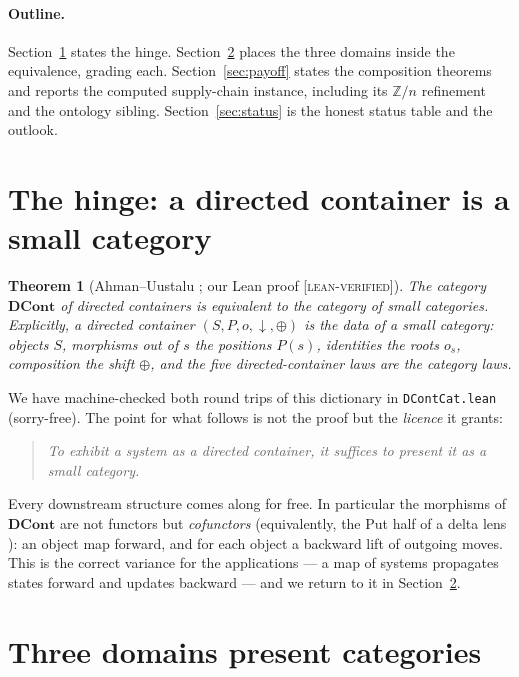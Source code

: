 \documentclass[11pt]{article}
\newtheorem{theorem}{Theorem}
\theoremstyle{definition}
\newcommand{\DCont}{\mathbf{DCont}}
\newcommand{\Zn}{\mathbb{Z}/n}
\newcommand{\gLean}{\textsc{[lean-verified]}}
\begin{document}
\paragraph{Outline.} Section~\ref{sec:hinge} states the hinge. Section~\ref{sec:domains}
places the three domains inside the equivalence, grading each. Section~\ref{sec:payoff}
states the composition theorems and reports the computed supply-chain instance, including
its $\Zn$ refinement and the ontology sibling. Section~\ref{sec:status} is the honest status
table and the outlook.

\section{The hinge: a directed container is a small category}\label{sec:hinge}

\begin{theorem}[Ahman--Uustalu \cite{au-dccat}; our Lean proof \gLean]\label{thm:hinge}
The category $\DCont$ of directed containers is equivalent to the category of small
categories. Explicitly, a directed container $(S,P,o,\downarrow,\oplus)$ is the data of a
small category: objects $S$, morphisms out of $s$ the positions $P(s)$, identities the
roots $o_s$, composition the shift $\oplus$, and the five directed-container laws are the
category laws.
\end{theorem}

We have machine-checked both round trips of this dictionary in \texttt{DContCat.lean}
(sorry-free). The point for what follows is not the proof but the \emph{licence} it grants:

\begin{quote}
\emph{To exhibit a system as a directed container, it suffices to present it as a small
category.}
\end{quote}

Every downstream structure comes along for free. In particular the morphisms of $\DCont$
are not functors but \emph{cofunctors} (equivalently, the Put half of a delta lens
\cite{clarke-lenses}): an object map forward, and for each object a backward lift of
outgoing moves. This is the correct variance for the applications --- a map of systems
propagates states forward and updates backward --- and we return to it in
Section~\ref{sec:domains}.

\section{Three domains present categories}\label{sec:domains}
\end{document}
